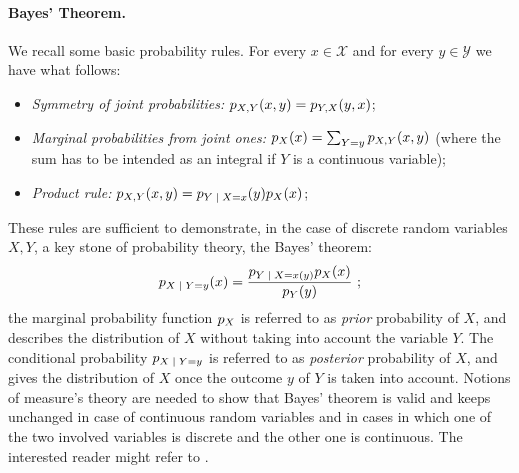 \paragraph*{Bayes' Theorem.}
We recall some basic probability rules. For every $x\in\mathcal{X}$ and for every $y\in\mathcal{Y}$ we have what follows:
\begin{itemize}
\item \emph{Symmetry of joint probabilities: } $p_{X,Y}(x,y)=p_{Y,X}(y,x)$;
\item \emph{Marginal probabilities from joint ones: } $p_X(x) = \sum_{Y=y}p_{X,Y}(x,y)$ (where the sum has to be intended as an integral if $Y$ is a continuous variable);
\item \emph{Product rule: } $\pdf_{X,Y}(x,y) = \pdf_{\given{Y}{X=x}}(y)\pdf_{X}(x)$;
\end{itemize} 
These rules are sufficient to demonstrate, in the case of discrete random variables $X,Y$, a key stone of probability theory, the Bayes' theorem: 
\begin{equation}
\pdf_{\given{X}{Y=y}}(x) = \frac{\pdf_{\given{Y}{X=x}(y)}\pdf_{X}(x)}{\pdf_{Y}(y)} \mbox{ ;}
\end{equation}
the marginal probability function $p_X$ is referred to as \emph{prior} probability of $X$, and describes the distribution of $X$ without taking into account the variable $Y$. The conditional probability $\pdf_{\given{X}{Y=y}}$ is referred to as \emph{posterior} probability of $X$, and gives the distribution of $X$ once the outcome $y$ of $Y$ is taken into account. Notions of measure's theory are needed to show that Bayes' theorem is valid and keeps unchanged in case of continuous random variables and in cases in which one of the two involved variables is discrete and the other one is continuous. The interested reader might refer to \cite{feller2008introduction}. 

